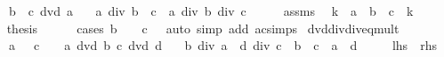 \begin{isabellebody}
\ \ \ {\isachardoublequoteopen}b\ {\isacharasterisk}{\kern0pt}\ c\ dvd\ a{\isachardoublequoteclose}\isanewline
\ \ \ {\isachardoublequoteopen}a\ div\ {\isacharparenleft}{\kern0pt}b\ {\isacharasterisk}{\kern0pt}\ c{\isacharparenright}{\kern0pt}\ {\isacharequal}{\kern0pt}\ a\ div\ b\ div\ c{\isachardoublequoteclose}\isanewline
%
\isadelimproof
%
\endisadelimproof
%
\isatagproof
{}\isamarkupfalse%
\ {\isacharminus}{\kern0pt}\isanewline
\ \ \isamarkupfalse%
\ assms\ \isamarkupfalse%
\ k\ \ {\isachardoublequoteopen}a\ {\isacharequal}{\kern0pt}\ b\ {\isacharasterisk}{\kern0pt}\ c\ {\isacharasterisk}{\kern0pt}\ k{\isachardoublequoteclose}\ \isacommand{{\isachardot}{\kern0pt}{\isachardot}{\kern0pt}}\isamarkupfalse%
\isanewline
\ \ \isamarkupfalse%
\ \isamarkupfalse%
\ {\isacharquery}{\kern0pt}thesis\isanewline
\ \ \ \ \isamarkupfalse%
\ {\isacharparenleft}{\kern0pt}cases\ {\isachardoublequoteopen}b\ {\isacharequal}{\kern0pt}\ {}\ {\isasymor}\ c\ {\isacharequal}{\kern0pt}\ {}{\isachardoublequoteclose}{\isacharparenright}{\kern0pt}\ {\isacharparenleft}{\kern0pt}auto{\isacharcomma}{\kern0pt}\ simp\ add{\isacharcolon}{\kern0pt}\ ac{\isacharunderscore}{\kern0pt}simps{\isacharparenright}{\kern0pt}\isanewline
{}\isamarkupfalse%
%
\endisatagproof
{\isafoldproof}%
%
\isadelimproof
\isanewline
%
\endisadelimproof
\isanewline
{}\isamarkupfalse%
\ dvd{\isacharunderscore}{\kern0pt}div{\isacharunderscore}{\kern0pt}div{\isacharunderscore}{\kern0pt}eq{\isacharunderscore}{\kern0pt}mult{\isacharcolon}{\kern0pt}\isanewline
\ \ \ {\isachardoublequoteopen}a\ {\isasymnoteq}\ {}{\isachardoublequoteclose}\ {\isachardoublequoteopen}c\ {\isasymnoteq}\ {}{\isachardoublequoteclose}\ \ {\isachardoublequoteopen}a\ dvd\ b{\isachardoublequoteclose}\ {\isachardoublequoteopen}c\ dvd\ d{\isachardoublequoteclose}\isanewline
\ \ \ {\isachardoublequoteopen}b\ div\ a\ {\isacharequal}{\kern0pt}\ d\ div\ c\ {\isasymlongleftrightarrow}\ b\ {\isacharasterisk}{\kern0pt}\ c\ {\isacharequal}{\kern0pt}\ a\ {\isacharasterisk}{\kern0pt}\ d{\isachardoublequoteclose}\isanewline
\ \ \ \ {\isacharparenleft}{\kern0pt}\ {\isachardoublequoteopen}{\isacharquery}{\kern0pt}lhs\ {\isasymlongleftrightarrow}\ {\isacharquery}{\kern0pt}rhs{\isachardoublequoteclose}{\isacharparenright}{\kern0pt}\isanewline
%
\isadelimproof
%
\endisadelimproof

\end{isabellebody}
